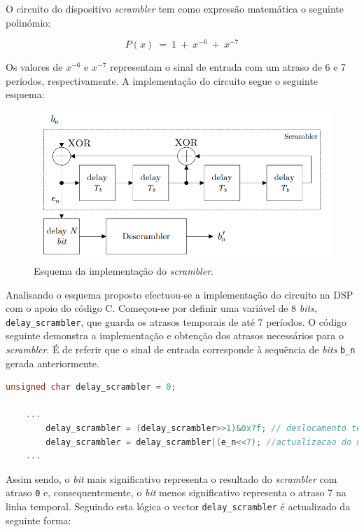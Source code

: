 \documentclass[11pt]{article}
\numberwithin{equation}{section}
\begin{document}
O circuito do dispositivo \textit{scrambler} tem como expressão matemática o seguinte polinómio:

\vspace{-3mm}
\begin{equation}
	P(x)~= ~1~+~x^{-6}~+~x^{-7}
\end{equation}  

\vspace{1mm}
Os valores de $x^{-6}$ e $x^{-7}$ representam o sinal de entrada com um atraso de 6 e 7 períodos, respectivamente. A implementação do circuito segue o seguinte esquema:

\begin{figure}[H]
	\centering
	\includegraphics[keepaspectratio=true, scale=0.50]{teoricas/scrambler}
	\caption{Esquema da implementação do \textit{scrambler}.}
	\vspace{-0.8em}
\end{figure}

Analisando o esquema proposto efectuou-se a implementação do circuito na DSP com o apoio do código C.
Começou-se por definir uma variável de 8 \textit{bits}, \texttt{delay\_scrambler}, que guarda os atrasos temporais de até 7 períodos. O código seguinte demonstra a implementação e obtenção dos atrasos necessários para o \textit{scrambler}. É de referir que o sinal de entrada corresponde à sequência de \textit{bits} \texttt{b\_n} gerada anteriormente.

\begin{lstlisting}[language=C]
	unsigned char delay_scrambler = 0;
	
	...
		delay_scrambler = (delay_scrambler>>1)&0x7f; // deslocamento temporal
		delay_scrambler = delay_scrambler|(e_n<<7); //actualizacao do novo valor de e_n no vector	
	...
\end{lstlisting}

Assim sendo, o \textit{bit} mais significativo representa o resultado do \textit{scrambler} com atraso \texttt{0} e, consequentemente, o \textit{bit} menos significativo representa o atraso 7 na linha temporal. Seguindo esta lógica o vector \texttt{delay\_scrambler} é actualizado da seguinte forma:
\end{document}
